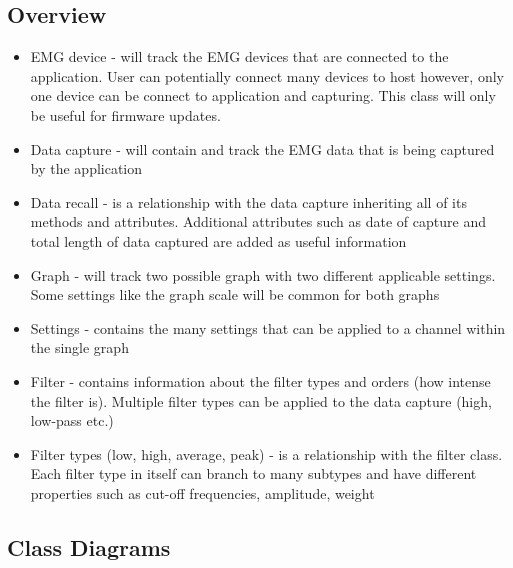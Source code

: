 \documentclass[12pt,a4paper]{article}
\begin{document}
\subsection{Overview}

\begin{itemize}
	\item EMG device - will track the EMG devices that are connected to the application. User can potentially connect many devices to host however, only one device can be connect to application and capturing.
						This class will only be useful for firmware updates. 
	\item Data capture - will contain and track the EMG data that is being captured by the application
	\item Data recall - is a relationship with the data capture inheriting all of its methods and attributes. 
						Additional attributes such as date of capture and total length of data captured are added as useful information
	\item Graph - will track two possible graph with two different applicable settings. Some settings like the graph scale will be common for both graphs
	\item Settings - contains the many settings that can be applied to a channel within the single graph
	\item Filter - contains information about the filter types and orders (how intense the filter is). Multiple filter types can be applied to the data capture (high, low-pass etc.)
	\item Filter types (low, high, average, peak) - is a relationship with the filter class. Each filter type in itself can branch to many subtypes and have different properties such as cut-off frequencies, amplitude, weight
\end{itemize}

\newpage

\subsection{Class Diagrams}
\end{document}
